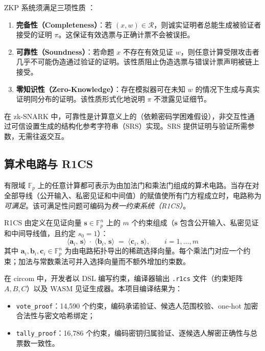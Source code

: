 ZKP 系统须满足三项性质 \cite{goldwasser1989}：
\begin{enumerate}
    \item \textbf{完备性（Completeness）}：若 $(x, w) \in \mathcal{R}$，则诚实证明者总能生成被验证者接受的证明 $\pi$。这保证有效选票与正确计票不会被误拒。
    \item \textbf{可靠性（Soundness）}：若命题 $x$ 不存在有效见证 $w$，则任意计算受限攻击者几乎不可能伪造通过验证的证明。该性质阻止伪造选票与错误计票声明被链上接受。
    \item \textbf{零知识性（Zero-Knowledge）}：存在模拟器可在未知 $w$ 的情况下生成与真实证明同分布的证明。该性质形式化地说明 $\pi$ 不泄露见证细节。
\end{enumerate}

在 zk-SNARK 中，可靠性是计算意义上的（依赖密码学困难假设），非交互性通过可信设置生成的结构化参考字符串（SRS）实现。SRS 提供证明与验证所需参数，无需往返交互。

\subsection{算术电路与 R1CS}

有限域 $\mathbb{F}_p$ 上的任意计算都可表示为由加法门和乘法门组成的算术电路。当存在对全部导线（公开输入、私密见证和中间值）的赋值使所有门方程成立时，电路称为\emph{可满足}。该可满足性问题可编码为\emph{秩一约束系统（R1CS）}。

R1CS 由定义在见证向量 $\mathbf{s} \in \mathbb{F}_p^n$ 上的 $m$ 个约束组成（$\mathbf{s}$ 包含公开输入、私密见证和中间导线值，且约定 $s_0 = 1$）：
\begin{equation}
    \langle \mathbf{a}_i,\, \mathbf{s} \rangle \;\cdot\; \langle \mathbf{b}_i,\, \mathbf{s} \rangle \;=\; \langle \mathbf{c}_i,\, \mathbf{s} \rangle, \qquad i = 1, \dots, m
\end{equation}
其中 $\mathbf{a}_i, \mathbf{b}_i, \mathbf{c}_i \in \mathbb{F}_p^n$ 为由电路拓扑导出的稀疏选择向量。每个乘法门对应一个约束；加法与常数乘法可并入选择向量而不额外增加约束数。

在 circom 中，开发者以 DSL 编写约束，编译器输出 \texttt{.r1cs} 文件（约束矩阵 $A, B, C$）以及 WASM 见证生成器。本项目编译结果为：
\begin{itemize}
    \item \texttt{vote\_proof}：14{,}590 个约束，编码承诺验证、候选人范围校验、one-hot 加密合法性与密文哈希绑定；
    \item \texttt{tally\_proof}：16{,}786 个约束，编码密钥归属验证、逐候选人解密正确性与总票数一致性。
\end{itemize}


